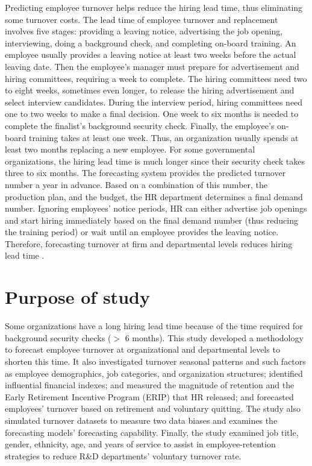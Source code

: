 Predicting employee turnover helps reduce the hiring lead time, thus eliminating some turnover costs. The lead time of employee turnover and replacement involves five stages: providing a leaving notice, advertising the job opening, interviewing, doing a background check, and completing on-board training. An employee usually provides a leaving notice at least two weeks before the actual leaving date. Then the employee's manager must prepare for advertisement and hiring committees, requiring a week to complete.  The hiring committees need two to eight weeks, sometimes even longer, to release the hiring advertisement and select interview candidates. During the interview period, hiring committees need one to two weeks to make a final decision. One week to six months is needed to complete the finalist's background security check. Finally, the employee's on-board training takes at least one week. Thus, an organization usually spends at least two months replacing a new employee. For some governmental organizations, the hiring lead time is much longer since their security check takes three to six months. The forecasting system provides the predicted turnover number a year in advance. Based on a combination of this number, the production plan, and the budget, the HR department determines a final demand number. Ignoring employees' notice periods, HR can either advertise job openings and start hiring immediately based on the final demand number (thus reducing the training period) or wait until an employee provides the leaving notice.  Therefore, forecasting turnover at firm and departmental levels reduces hiring lead time \citep{kacmar2006}. 
\section{Purpose of study}
Some organizations have a long hiring lead time because of the time required for background security checks ($>$ 6 months). This study developed a methodology to forecast employee turnover at organizational and departmental levels to shorten this time. It also investigated turnover seasonal patterns and such factors as employee demographics, job categories, and organization structures; identified influential financial indexes; and measured the magnitude of retention and the Early Retirement Incentive Program (ERIP) \citep{ERIP} that HR released; and forecasted employees' turnover based on retirement and voluntary quitting. The study also simulated turnover datasets to measure two data biases and examines the forecasting models' forecasting capability. Finally, the study examined job title, gender, ethnicity, age, and years of service to assist in employee-retention strategies to reduce R\&D departments' voluntary turnover rate. 

